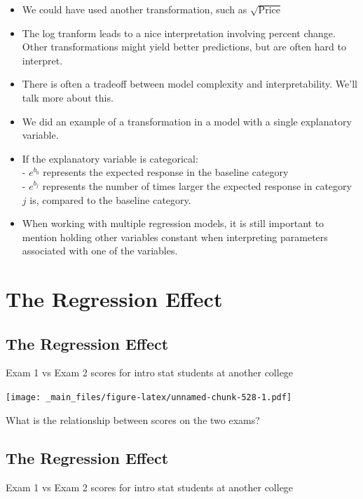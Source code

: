 \documentclass[]{book}
\begin{document}
\begin{itemize}
\item
  We could have used another transformation, such as
  \(\sqrt{\text{Price}}\)
\item
  The log tranform leads to a nice interpretation involving percent
  change. Other transformations might yield better predictions, but are
  often hard to interpret.
\item
  There is often a tradeoff between model complexity and
  interpretability. We'll talk more about this.
\item
  We did an example of a transformation in a model with a single
  explanatory variable.
\item
  If the explanatory variable is categorical:\\
  - \(e^{b_0}\) represents the expected response in the baseline
  category\\
  - \(e^{b_j}\) represents the number of times larger the expected
  response in category \(j\) is, compared to the baseline category.
\item
  When working with multiple regression models, it is still important to
  mention holding other variables constant when interpreting parameters
  associated with one of the variables.
\end{itemize}

\section{The Regression Effect}\label{the-regression-effect}

\subsection{The Regression Effect}\label{the-regression-effect-1}

Exam 1 vs Exam 2 scores for intro stat students at another college

\texttt{[image: \_main\_files/figure-latex/unnamed-chunk-528-1.pdf]}

What is the relationship between scores on the two exams?

\subsection{The Regression Effect}\label{the-regression-effect-2}

Exam 1 vs Exam 2 scores for intro stat students at another college
\end{document}
